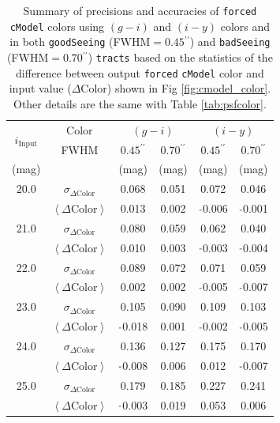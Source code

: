 \documentclass[useamsfonts]{pasj01}
\def\asec{$^{\prime\prime}$}
\def\cmodel{\texttt{cModel}}
\def\forced{\texttt{forced}}
\def\tracts{\texttt{tracts}}
\newcommand{\minus}{\raisebox{.4\height}{\scalebox{.8}{-}}}
\newcommand{\scolor}{$\sigma_{\Delta\mathrm{Color}}$}
\newcommand{\mcolor}{$\left<{\Delta\mathrm{Color}}\right>$}
\newcommand{\n}{$\minus$}
\begin{document}
\begin{table}
    \begin{center}
    \begin{tabular}{| c | c | c | c | c | c | }
    \hline
    \multirow{2}{*}{$i_{\mathrm{Input}}$} & Color & \multicolumn{2}{|c|}{$(g-i)$} & \multicolumn{2}{|c|}{$(i-y)$} \\
    \cline{2-6}
      & FWHM & $0.45$\asec{} & $0.70$\asec{} & $0.45$\asec{} & $0.70$\asec{} \\
    \hline
    (mag) & & (mag) & (mag) & (mag) & (mag) \\
    \hline
    \rowcolor[gray]{.85} 20.0 & \scolor{} &   0.068 & 0.051 &   0.072 &   0.046 \\
    \rowcolor[gray]{.85}      & \mcolor{} &   0.013 & 0.002 & \n0.006 & \n0.001 \\
    \hline 
    \rowcolor[gray]{1.0} 21.0 & \scolor{} &   0.080 & 0.059 &   0.062 &   0.040 \\
    \rowcolor[gray]{1.0}      & \mcolor{} &   0.010 & 0.003 & \n0.003 & \n0.004 \\
    \hline
    \rowcolor[gray]{.85} 22.0 & \scolor{} &   0.089 & 0.072 &   0.071 &   0.059 \\
    \rowcolor[gray]{.85}      & \mcolor{} &   0.002 & 0.002 & \n0.005 & \n0.007 \\
    \hline
    \rowcolor[gray]{1.0} 23.0 & \scolor{} &   0.105 & 0.090 &   0.109 &   0.103 \\
    \rowcolor[gray]{1.0}      & \mcolor{} & \n0.018 & 0.001 & \n0.002 & \n0.005 \\
    \hline
    \rowcolor[gray]{.85} 24.0 & \scolor{} &   0.136 & 0.127 &   0.175 &   0.170 \\
    \rowcolor[gray]{.85}      & \mcolor{} & \n0.008 & 0.006 &   0.012 & \n0.007 \\
    \hline
    \rowcolor[gray]{1.0} 25.0 & \scolor{} &   0.179 & 0.185 &   0.227 &   0.241 \\
    \rowcolor[gray]{1.0}      & \mcolor{} & \n0.003 & 0.019 &   0.053 &   0.006 \\
    \hline
    \end{tabular}
    \end{center}
    \caption{
        Summary of precisions and accuracies of \forced{} \cmodel{} colors using 
        $(g-i)$ and $(i-y)$ colors and in both \texttt{goodSeeing} (FWHM$=0.45$\asec{}) 
        and \texttt{badSeeing} (FWHM$=0.70$\asec{}) \tracts{} based on the statistics of 
        the difference between output \forced{} \cmodel{} color and input value 
        ($\Delta\mathrm{Color}$) shown in Fig \ref{fig:cmodel_color}.
        Other details are the same with Table \ref{tab:psfcolor}.
    }
        \label{tab:cmodelcolor}
\end{table}
\end{document}

